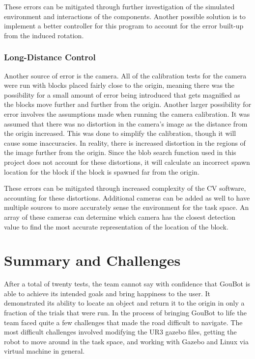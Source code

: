             These errors can be mitigated through further investigation of the simulated environment and interactions of the components. Another possible solution is to implement a better controller for this program to account for the error built-up from the induced rotation.
            
        \subsubsection*{Long-Distance Control}
        
            Another source of error is the camera. All of the calibration tests for the camera were run with blocks placed fairly close to the origin, meaning there was the possibility for a small amount of error being introduced that gets magnified as the blocks move further and further from the origin. Another larger possibility for error involves the assumptions made when running the camera calibration. It was assumed that there was no distortion in the camera's image as the distance from the origin increased. This was done to simplify the calibration, though it will cause some inaccuracies. In reality, there is increased distortion in the regions of the image further from the origin. Since the blob search function used in this project does not account for these distortions, it will calculate an incorrect spawn location for the block if the block is spawned far from the origin. 
            
            These errors can be mitigated through increased complexity of the CV software, accounting for these distortions. Additional cameras can be added as well to have multiple sources to more accurately sense the environment for the task space. An array of these cameras can determine which camera has the closest detection value to find the most accurate representation of the location of the block. 

\newpage
\section{Summary and Challenges} \label{sec:summary_challenges}
    


    After a total of twenty tests, the team cannot say with confidence that GouBot is able to achieve its intended goals and bring happiness to the user. It demonstrated its ability to locate an object and return it to the origin in only a fraction of the trials that were run. In the process of bringing GouBot to life the team faced quite a few challenges that made the road difficult to navigate. The most difficult challenges involved modifying the UR3 gazebo files, getting the robot to move around in the task space, and working with Gazebo and Linux via virtual machine in general.
    
